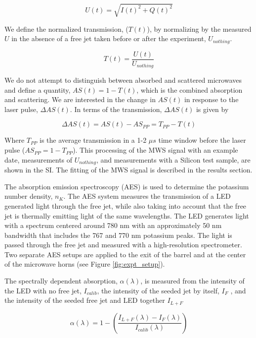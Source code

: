 \begin{equation}
    U(t) = \sqrt{I(t)^2 + Q(t)^2}
\end{equation}

We define the normalized transmission, ($T(t)$), by normalizing by the measured $U$ in the absence of a free jet taken before or after the experiment, $U_{nothing}$. 

\begin{equation}
    \label{eq:transmission_def}
    T(t) = \frac{U(t)}{U_{nothing}}
\end{equation}

We do not attempt to distinguish between absorbed and scattered microwaves and define a quantity, $AS(t) = 1- T(t)$, which is the combined absorption and scattering. We are interested in the change in $AS(t)$ in response to the laser pulse, $\Delta AS(t)$. In terms of the transmission, $\Delta AS(t)$ is given by

\begin{equation}
    \Delta AS(t) = AS(t) - AS_{PP} =  T_{PP} - T(t)
\end{equation}

Where $T_{PP}$ is the average transmission in a 1-2 $\mu s$ time window before the laser pulse ($AS_{PP} = 1 - T_{PP}$). This processing of the MWS signal with an example date, measurements of $U_{nothing}$, and measurements with a Silicon test sample, are shown in the SI. The fitting of the MWS signal is described in the results section. 


The absorption emission spectroscopy (AES) is used to determine the potassium number density, $n_K$. The AES system measures the transmission of a LED generated light through the free jet, while also taking into account that the free jet is thermally emitting light of the same wavelengths. The LED generates light with a spectrum centered around 780 nm with an approximately 50 nm bandwidth that includes the 767 and 770 nm potassium peaks. The light is passed through the free jet and measured with a high-resolution spectrometer. Two separate AES setups are applied to the exit of the barrel and at the center of the microwave horns (see Figure \ref{fig:expt_setup}).

The spectrally dependent absorption, $\alpha(\lambda)$, is measured from the intensity of the LED with no free jet, $I_{calib}$, the intensity of the seeded jet by itself, $I_F$ , and the intensity of the seeded free jet and LED together $I_{L+F}$

\begin{equation}
    \label{eq:absorption_def}
    \alpha(\lambda) = 1 - \left(\frac{I_{L+F}(\lambda) - I_{F}(\lambda)}{I_{calib}(\lambda)}\right)
\end{equation}


